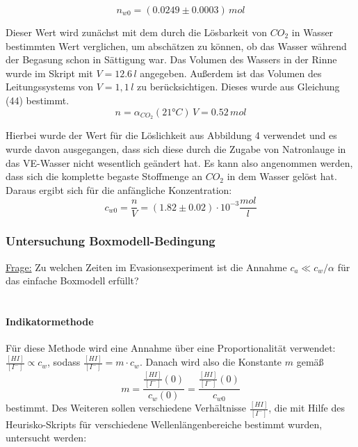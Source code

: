 \documentclass[12pt]{article}
\begin{document}
\begin{equation}
n_{w0} = (0.0249 \pm 0.0003) \,mol
\end{equation}

Dieser Wert wird zun\"achst mit dem durch die Lösbarkeit von $CO_2$ in Wasser bestimmten Wert verglichen, um absch\"atzen zu können, ob das Wasser w\"ahrend der Begasung schon in S\"attigung war. Das Volumen des Wassers in der Rinne wurde im Skript mit $V = 12.6 \,l $ angegeben. Außerdem ist das Volumen des Leitungssystems von $V=1,1 \,l $ zu ber\"ucksichtigen. Dieses wurde aus Gleichung (44) \cite{jaehne} bestimmt.
\begin{equation}
n = \alpha_{CO_2}(21 °C) \, V = 0.52 \, mol
\end{equation}

Hierbei wurde der Wert für die L\"oslichkeit aus Abbildung 4 \cite{jaehne} verwendet und es wurde davon ausgegangen, dass sich diese durch die Zugabe von Natronlauge in das VE-Wasser nicht wesentlich geändert hat. Es kann also angenommen werden, dass sich die komplette begaste Stoffmenge an $CO_2$ in dem Wasser gelöst hat. Daraus ergibt sich für die anfängliche Konzentration:
\begin{equation}
c_{w0} = \frac{n}{V} = (1.82 \pm 0.02)\cdot 10^{-3} \frac{mol}{l}
\end{equation}

\subsubsection{Untersuchung Boxmodell-Bedingung}

\underline{Frage:} Zu welchen Zeiten im Evasionsexperiment ist die Annahme $c_a \ll c_w/\alpha $ für das einfache Boxmodell erfüllt? \\ \\

\paragraph{Indikatormethode\\}

Für diese Methode wird eine Annahme über eine Proportionalität verwendet: $\frac{[HI]}{[I^-]} \propto c_w $, sodass $\frac{[HI]}{[I^-]} = m \cdot c_w $. Danach wird also die Konstante $m$ gemäß
\begin{equation}
m = \frac{\frac{[HI]}{[I^-]}(0)}{c_w(0)} = \frac{\frac{[HI]}{[I^-]}(0)}{c_{w0}} 
\end{equation}
bestimmt. Des Weiteren sollen verschiedene Verhältnisse $\frac{[HI]}{[I^-]}$, die mit Hilfe des Heurisko-Skripts für verschiedene Wellenlängenbereiche bestimmt wurden, untersucht werden: \\
\end{document}
